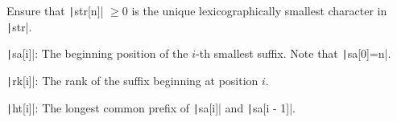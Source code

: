 Ensure that \texttt|str[n]| $\geq 0$ is the unique lexicographically smallest character in \texttt|str|.

\begin{compactenum}
\item \texttt|sa[i]|: The beginning position of the $i$-th smallest suffix. Note that \texttt|sa[0]=n|.
\item \texttt|rk[i]|: The rank of the suffix beginning at position $i$.
\item \texttt|ht[i]|: The longest common prefix of \texttt|sa[i]| and \texttt|sa[i - 1]|.
\end{compactenum}

\inputminted{cpp}{src/string/suffix/suffix-array-sais.cpp.com}
